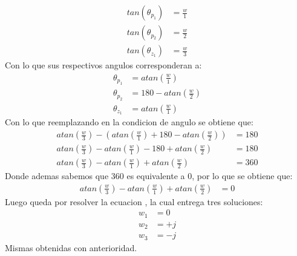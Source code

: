 \documentclass[
  11pt,
  letterpaper,
   addpoints,
   answers
  ]{exam}
\begin{document}
\begin{questions}
\begin{solution}
\begin{align}
    tan(\theta_{p_{1}})&= \frac{w}{1}\\
    tan(\theta_{p_{2}})&= \frac{w}{2}\\
    tan(\theta_{z_{1}})&= \frac{w}{3}
\end{align}
Con lo que sus respectivos angulos corresponderan a:
\begin{align}
    \theta_{p_{1}} &= atan(\frac{w}{1})\\
    \theta_{p_{2}} &= 180 - atan(\frac{w}{2})\\
    \theta_{z_{1}} &= atan(\frac{w}{1})
\end{align}
Con lo que reemplazando en la condicion de angulo se obtiene que:
\begin{align}
    atan(\frac{w}{3}) - (atan(\frac{w}{1}) + 180 - atan(\frac{w}{2})) &= 180\\
    atan(\frac{w}{3}) - atan(\frac{w}{1}) - 180 + atan(\frac{w}{2}) &= 180\\
    atan(\frac{w}{3}) - atan(\frac{w}{1}) + atan(\frac{w}{2}) &= 360
\end{align}
Donde ademas sabemos que 360 es equivalente a 0, por lo que se obtiene que:
\begin{align}
    atan(\frac{w}{3}) - atan(\frac{w}{1}) + atan(\frac{w}{2}) &= 0
\end{align}
Luego queda por resolver la ecuacion , la cual entrega tres soluciones:
\begin{align}
    w_{1} &= 0\\
    w_{2} &= +j\\
    w_{3} &= -j
\end{align}
Mismas obtenidas con anterioridad.
\end{solution}

\end{questions}
\newpage
\end{document}
